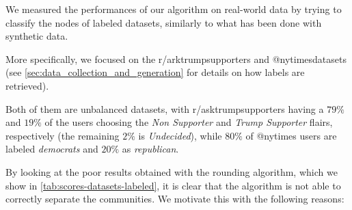 We measured the performances of our algorithm on real-world data by trying to
classify the nodes of labeled datasets, similarly to what has been done
with synthetic data.

More specifically, we focused on the r/arktrumpsupporters and
@nytimes\footnotemark datasets (see
\autoref{sec:data_collection_and_generation} for details on how labels are
retrieved).

Both of them are unbalanced datasets, with r/asktrumpsupporters having a $79\%$
and $19\%$ of the users choosing the \emph{Non Supporter} and \emph{Trump
	Supporter} flairs, respectively (the remaining $2\%$ is
\emph{Undecided}), while $80\%$ of @nytimes users are labeled \emph{democrats}
and $20\%$ as \emph{republican}.

By looking at the poor results obtained with the rounding algorithm, which we show in
\autoref{tab:scores-datasets-labeled}, it is clear that the algorithm is not
able to correctly separate the communities. We motivate this with the following
reasons:
